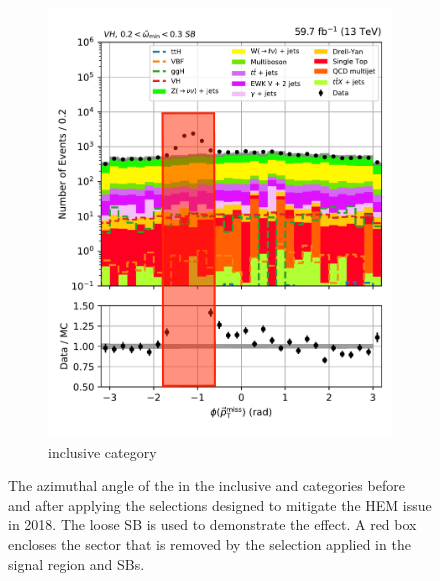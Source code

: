 \begin{figure}[htbp]
\begin{subfigure}[b]{0.34\textwidth}
        \includegraphics[width=\textwidth]{figures/hem_issue/sideband_4/met_phi/met_phi_VH_before_annotated.pdf}
        \caption{\VH inclusive category}
    \end{subfigure}
    \caption[The azimuthal angle of the \ptvecmiss in the inclusive \ttH and \VH categories before and after applying the selections designed to mitigate the HEM issue in 2018]{The azimuthal angle of the \ptvecmiss in the inclusive \ttH and \VH categories before and after applying the selections designed to mitigate the HEM issue in 2018. The loose \omegaTilde \gls{SB} is used to demonstrate the effect. A red box encloses the sector that is removed by the selection applied in the signal region and \glspl{SB}.}
    \label{fig:htoinv_hem_issue_met_phi}
\end{figure}
